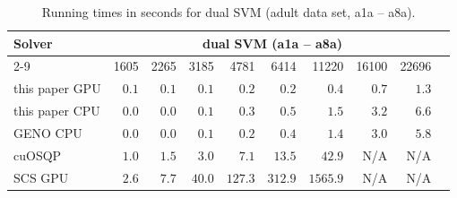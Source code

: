
\begin{table}[h!]
\begin{center}
\small
  \begin{tabular}{l*{9}{r}}
    \toprule
    \multirow{2}{*}{Solver} & \multicolumn{8}{c}{dual SVM (a1a – a8a)} \\
    \cmidrule{2-9}
    & 1605 & 2265 & 3185 & 4781 & 6414 & 11220 & 16100 & 22696 \\
    \midrule
    this paper GPU & $0.1$ & $0.1$ & $0.1$ & $0.2$ & $0.2$ & $0.4$ & $0.7$ & $1.3$ \\
    this paper CPU & $0.0$ & $0.0$ & $0.1$ & $0.3$ & $0.5$ & $1.5$ & $3.2$ & $6.6$ \\
    GENO CPU & $0.0$ & $0.0$ & $0.1$ & $0.2$ & $0.4$ & $1.4$ & $3.0$ & $5.8$ \\
    cuOSQP & $1.0$ & $1.5$ & $3.0$ & $7.1$ & $13.5$ & $42.9$ & N/A & N/A \\
    SCS GPU & $2.6$ & $7.7$ & $40.0$ & $127.3$ & $312.9$ & $1565.9$ & N/A & N/A \\
    \bottomrule
  \end{tabular}%
  \caption{Running times in seconds for dual SVM (adult data set, a1a – a8a).}
  \end{center}
\end{table}
